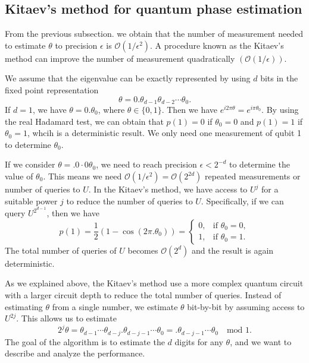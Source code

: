 \documentclass[11pt]{article}
\begin{document}
\subsection{Kitaev's method for quantum phase estimation}
From the previous subsection. we obtain that the number of measurement needed to estimate $\theta$ to precision $\epsilon$ is $\mathcal{O}(1/\epsilon^2)$. A procedure known as the Kitaev's method can improve the number of measurement quadratically $(\mathcal{O}(1/\epsilon))$. 

We assume that the eigenvalue can be exactly represented by using $d$ bits in the fixed point representation 
\begin{equation}
    \theta = 0.\theta_{d-1}\theta_{d-2}\cdots\theta_0.
\end{equation}
If $d = 1$, we have $\theta = 0.\theta_0$, where $\theta\in\{0,1\}$. Then we have $e^{i2\pi\theta} = e^{i\pi\theta_0}$. By using the real Hadamard test, we can obtain that $p(1) = 0$ if $\theta_0 = 0$ and $p(1) = 1$ if $\theta_0 = 1$, whcih is a deterministic result. We only need one measurement of qubit 1 to determine $\theta_0$.

If we consider $\theta = .0\cdot0\theta_0$, we need to reach precision $\epsilon < 2^{-d}$ to determine the value of $\theta_0$. This means we need $\mathcal{O}(1/\epsilon^2) = \mathcal{O}(2^{2d})$ repeated measurements or number of queries to $U$. In the Kitaev's method, we have access to $U^j$ for a suitable power $j$ to reduce the number of queries to $U$. Specifically, if we can query $U^{2^{d-1}}$, then we have 
\begin{equation}
    p(1) = \frac{1}{2}(1 - \cos(2\pi.\theta_0)) = \begin{cases}
        0, & \text{if } \theta_0 = 0, \\
        1, & \text{if } \theta_0 = 1.
    \end{cases}
\end{equation}
The total number of queries of $U$ becomes $\mathcal{O}(2^d)$ and the result is again deterministic.

As we explained above, the Kitaev's method use a more complex quantum circuit with a larger circuit depth to reduce the total number of queries. Instead of estimating $\theta$ from a single number, we estimate $\theta$ bit-by-bit by assuming access to $U^{2j}$. This allows us to estimate 
\begin{equation}
    2^j\theta = \theta_{d-1}\cdots\theta_{d-j}.\theta_{d-j-1}\cdots\theta_0 = .\theta_{d-j-1}\cdots\theta_0 \quad \text{mod } 1.
\end{equation}
The goal of the algorithm is to estimate the $d$ digits for any $\theta$, and we want to describe and analyze the performance. 
\end{document}
